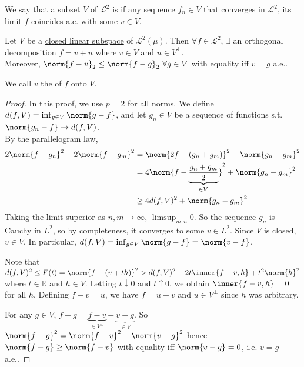 \begin{definition}
	We say that a subset $V$ of $\mathcal L^2$ is  if any sequence $f_n \in V$ that converges in $\mathcal L^2$, its limit $f$ coincides a.e. with some $v \in V$.
\end{definition}

\begin{theorem}
	Let $V$ be a \underline{closed linear subspace} of $\mathcal L^2(\mu)$.
	Then $\forall f \in \mathcal L^2$, $\exists$ an orthogonal decomposition $f = v + u$ where $v \in V$ and $u \in V^\perp$. \\
	Moreover, $\norm{f - v}_2 \leq \norm{f - g}_2 \ \forall g \in V$ with equality iff $v = g$ a.e..
\end{theorem}

\begin{definition}[Projection]
	We call $v$ the  of $f$ onto $V$.
\end{definition}

\begin{proof}
	In this proof, we use $p = 2$ for all norms.
	We define $d(f,V) = \inf_{g \in V} \norm{g - f}$, and let $g_n \in V$ be a sequence of functions s.t. $\norm{g_n - f} \to d(f,V)$. \\
	By the parallelogram law,
	\begin{align*}
		2\norm{f - g_n}^2 + 2\norm{f - g_m}^2 &= \norm{2f - (g_n + g_m)}^2 + \norm{g_n - g_m}^2 \\
		&= 4 \norm{f - \underbrace{\frac{g_n + g_m}{2}}_{\in V}}^2 + \norm{g_n - g_m}^2 \\
		&\geq 4 d(f,V)^2 + \norm{g_n - g_m}^2
	\end{align*}
	Taking the limit superior as $n, m \to \infty$, $\limsup_{m,n} 0$.
	So the sequence $g_n$ is Cauchy in $L^2$, so by completeness, it converges to some $v \in L^2$.
	Since $V$ is closed, $v \in V$.
	In particular, $d(f,V) = \inf_{g \in V} \norm{g - f} = \norm{v - f}$.

	Note that $d(f,V)^2 \leq F(t) = \norm{f - (v+th)}^2 > d(f, V)^2 - 2t \inner{f-v, h} + t^2 \norm{h}^2$ where $t \in \mathbb R$ and $h \in V$.
	Letting $t \downarrow 0$ and $t \uparrow 0$, we obtain $\inner{f - v, h} = 0$ for all $h$.
	Defining $f - v = u$, we have $f = u + v$ and $u \in V^\perp$ since $h$ was arbitrary.

	For any $g \in V$, $f - g = \underbrace{f-v}_{\in V^\perp} + \underbrace{v - g}_{\in V}$.
	So $\norm{f - g}^2 = \norm{f - v}^2 + \norm{v - g}^2$ hence $\norm{f - g} \geq \norm{f - v}$ with equality iff $\norm{v - g} = 0$, i.e. $v = g$ a.e..

\end{proof}

